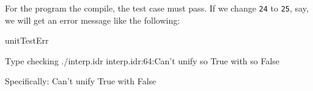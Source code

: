 \noindent
For the program the compile, the test case must pass. If we change \texttt{24} to \texttt{25},
say, we will get an error message like the following:

\begin{SaveVerbatim}{unitTestErr}

Type checking ./interp.idr
interp.idr:64:Can't unify so True with so False

Specifically:
	 Can't unify True with False

\end{SaveVerbatim}


